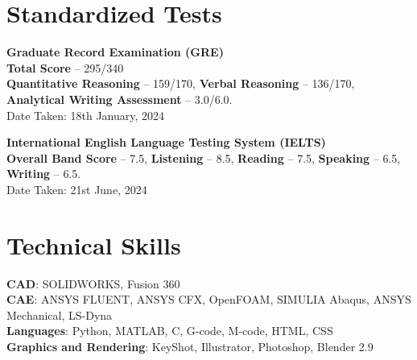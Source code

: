 \documentclass[letterpaper,11pt]{article}
\begin{document}
\section{Standardized Tests}
\begin{itemize}[leftmargin=0in, label={}]
{\item{
\textbf{Graduate Record Examination (GRE)} \\ \textbf{Total Score} – 295/340\\ \textbf{Quantitative Reasoning} – 159/170, \textbf{Verbal Reasoning} – 136/170, \textbf{Analytical Writing Assessment} – 3.0/6.0.\\
Date Taken: 18th January, 2024
}}
{\item{
{\textbf{International English Language Testing System (IELTS)}\\
\textbf{Overall Band Score} – 7.5, \textbf{Listening} – 8.5, \textbf{Reading} – 7.5, \textbf{Speaking} – 6.5, \textbf{Writing} – 6.5.\\
Date Taken: 21st June, 2024}}}
\end{itemize}

\section{Technical Skills}
\begin{itemize}[leftmargin=0in, label={}]
{\item{
\textbf{CAD}{: SOLIDWORKS, Fusion 360} \\
\vspace{2pt}
\textbf{CAE}{: ANSYS FLUENT, ANSYS CFX, OpenFOAM, SIMULIA Abaqus, ANSYS Mechanical, LS-Dyna} \\
\vspace{2pt}
\textbf{Languages}{: Python, MATLAB, C, G-code, M-code, HTML, CSS} \\
\vspace{2pt}
\textbf{Graphics and Rendering}{: KeyShot, Illustrator, Photoshop, Blender 2.9} \\
}}
\end{itemize}
\vspace{-16pt}
\end{document}
